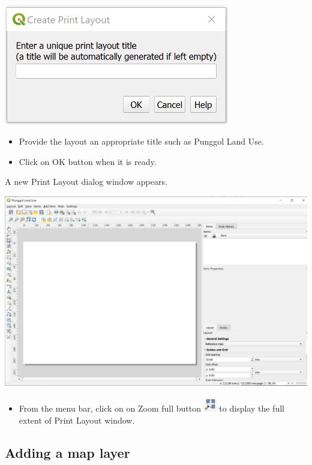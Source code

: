 \documentclass[
  letterpaper,
  DIV=11,
  numbers=noendperiod]{scrreprt}
\providecommand{\tightlist}{%
  \setlength{\itemsep}{0pt}\setlength{\parskip}{0pt}}\usepackage{longtable,booktabs,array}
\begin{document}
\includegraphics[width=3.875in,height=\textheight]{./img04/image44.jpg}

\begin{itemize}
\item
  Provide the layout an appropriate title such as Punggol Land Use.
\item
  Click on OK button when it is ready.
\end{itemize}

A new Print Layout dialog window appears.

\includegraphics{./img04/image45.jpg}

\begin{itemize}
\tightlist
\item
  From the menu bar, click on on Zoom full button
  \includegraphics[width=0.21875in,height=0.26042in]{./img04/image48.jpg}
  to display the full extent of Print Layout window.
\end{itemize}

\hypertarget{adding-a-map-layer}{%
\subsection{Adding a map layer}\label{adding-a-map-layer}}
\end{document}
